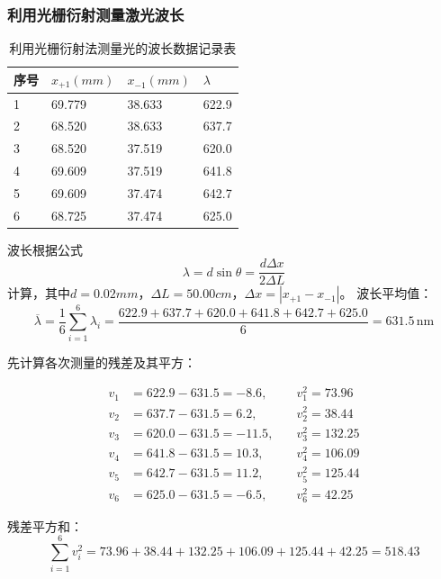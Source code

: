\documentclass[10pt,a4paper]{ctexart}
\begin{document}
    \subsubsection{利用光栅衍射测量激光波长}
    \begin{table}[H]
\centering
\caption{利用光栅衍射法测量光的波长数据记录表}
\label{tab:lambda}
\begin{tabular}{|ll|ll|}
\hline
\multicolumn{1}{|l|}{序号} & $x_{+1}(mm)$ & \multicolumn{1}{l|}{$x_{-1}(mm)$} & $\lambda$                        \\ \hline
\multicolumn{1}{|l|}{1} & 69.779 & \multicolumn{1}{l|}{38.633} & 622.9 \\ \hline
\multicolumn{1}{|l|}{2} & 68.520 & \multicolumn{1}{l|}{38.633} & 637.7 \\ \hline
\multicolumn{1}{|l|}{3} & 68.520 & \multicolumn{1}{l|}{37.519} & 620.0 \\ \hline
\multicolumn{1}{|l|}{4} & 69.609 & \multicolumn{1}{l|}{37.519} & 641.8 \\ \hline
\multicolumn{1}{|l|}{5} & 69.609 & \multicolumn{1}{l|}{37.474} & 642.7 \\ \hline
\multicolumn{1}{|l|}{6} & 68.725 & \multicolumn{1}{l|}{37.474} & 625.0 \\ \hline
\end{tabular}%
\end{table}
波长根据公式$$ \lambda = d \sin \theta = \frac{d \Delta x}{2 \Delta L} $$
计算，其中$d =  0.02  mm$，$\Delta L = 50.00 cm$，$\Delta x = |x_{+1} - x_{-1}|$。
波长平均值：
$$ \overline{\lambda} = \frac{1}{6} \sum_{i=1}^{6} \lambda_i = \frac{622.9 + 637.7 + 620.0 + 641.8 + 642.7 + 625.0}{6} =631.5\, \text{nm}$$

先计算各次测量的残差及其平方：

\begin{align*}
v_1 &= 622.9 - 631.5 = -8.6, &\quad v_1^2 = 73.96 \\
v_2 &= 637.7 - 631.5 = 6.2, &\quad v_2^2 = 38.44 \\
v_3 &= 620.0 - 631.5 = -11.5, &\quad v_3^2 = 132.25 \\
v_4 &= 641.8 - 631.5 = 10.3, &\quad v_4^2 = 106.09 \\
v_5 &= 642.7 - 631.5 = 11.2, &\quad v_5^2 = 125.44 \\
v_6 &= 625.0 - 631.5 = -6.5, &\quad v_6^2 = 42.25
\end{align*}

残差平方和：
$$ \sum_{i=1}^{6} v_i^2 = 73.96 + 38.44 + 132.25 + 106.09 + 125.44 + 42.25 = 518.43 $$
\end{document}

